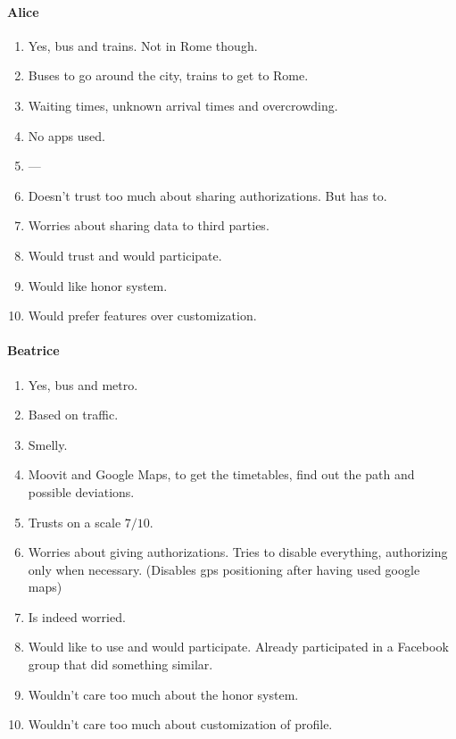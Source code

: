 \documentclass[a4paper, 10pt]{article}
\begin{document}
\paragraph*{Alice}
\begin{enumerate}
    \item Yes, bus and trains. Not in Rome though.
    \item Buses to go around the city, trains to get to Rome.
    \item Waiting times, unknown arrival times and overcrowding.
    \item No apps used.
    \item ---
    \item Doesn't trust too much about sharing authorizations. But has to.
    \item Worries about sharing data to third parties.
    \item Would trust and would participate.
    \item Would like honor system.
    \item Would prefer features over customization. 
\end{enumerate}


\paragraph*{Beatrice}

\begin{enumerate}
    \item Yes, bus and metro.
    \item Based on traffic.
    \item Smelly.
    \item Moovit and Google Maps, to get the timetables, find out the path and possible deviations.
    \item Trusts on a scale $7/10$.
    \item Worries about giving authorizations. Tries to disable everything, authorizing only when necessary. (Disables gps positioning after having used google maps)
    \item Is indeed worried.
    \item Would like to use and would participate. Already participated in a Facebook group that did something similar.
    \item Wouldn't care too much about the honor system.
    \item Wouldn't care too much about customization of profile.
\end{enumerate}
\end{document}
